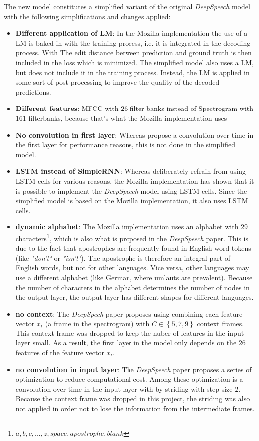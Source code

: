 The new model constitutes a simplified variant of the original \textit{DeepSpeech} model with the following simplifications and changes applied:

\begin{itemize}
	\item \textbf{Different application of LM}: In the Mozilla implementation the use of a \ac{LM} is baked in with the training process, i.e. it is integrated in the decoding process. With The edit distance between prediction and ground truth is then included in the loss which is minimized. The simplified model also uses a \ac{LM}, but does not include it in the training process. Instead, the \ac{LM} is applied in some sort of post-processing to improve the quality of the decoded predictions.
	\item \textbf{Different features}: MFCC with 26 filter banks instead of Spectrogram with 161 filterbanks, because that's what the Mozilla implementation uses
	\item \textbf{No convolution in first layer}: Whereas \cite{ctc_paper} propose a convolution over time in the first layer for performance reasons, this is not done in the simplified model.
	\item \textbf{LSTM instead of SimpleRNN}: Whereas \cite{ctc_paper} deliberately refrain from using \ac{LSTM} cells for various reasons, the Mozilla implementation has shown that it is possible to implement the \textit{DeepSpeech} model using \ac{LSTM} cells. Since the simplified model is based on the Mozilla implementation, it also uses \ac{LSTM} cells.
	\item \textbf{dynamic alphabet}: The Mozilla implementation uses an alphabet with 29 characters\footnote{${a,b,c,...,z, space, apostrophe, blank}$}, which is also what is proposed in the \textit{DeepSpeech} paper. This is due to the fact that apostrophes are frequently found in English word tokens (like \textit{"don't"} or \textit{"isn't"}). The apostrophe is therefore an integral part of English words, but not for other languages. Vice versa, other languages may use a different alphabet (like German, where umlauts are prevalent). Because the number of characters in the alphabet determines the number of nodes in the output layer, the output layer has different shapes for different languages.
	\item \textbf{no context}: The \textit{DeepSpech} paper proposes using combining each feature vector $x_t$ (a frame in the spectrogram) with $C \in \left\{ 5,7,9 \right\}$ context frames. This context frame was dropped to keep the nuber of features in the input layer small. As a result, the first layer in the model only depends on the $26$ features of the feature vector $x_t$.
	\item \textbf{no convolution in input layer}: The \textit{DeepSpeech} paper proposes a series of optimization to reduce computational cost. Among these optimization is a convolution over time in the input layer with by striding with step size $2$. Because the context frame was dropped in this project, the striding was also not applied in order not to lose the information from the intermediate frames.
\end{itemize}



